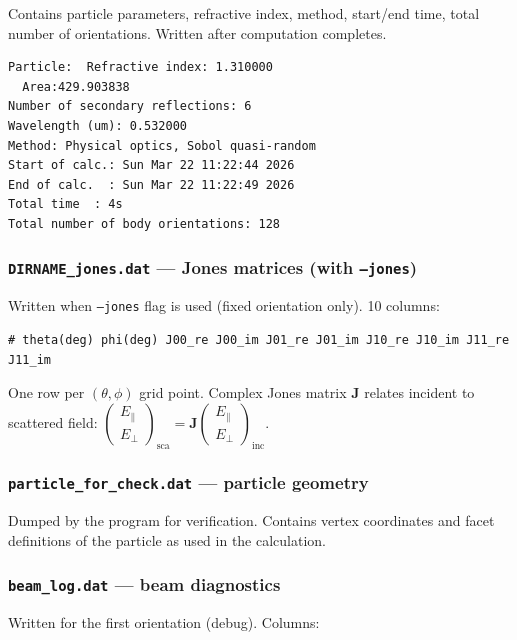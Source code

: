 \documentclass[11pt,a4paper]{article}
\begin{document}
Contains particle parameters, refractive index, method, start/end time,
total number of orientations. Written after computation completes.

\begin{lstlisting}[basicstyle=\ttfamily\scriptsize]
Particle:  Refractive index: 1.310000
  Area:429.903838
Number of secondary reflections: 6
Wavelength (um): 0.532000
Method: Physical optics, Sobol quasi-random
Start of calc.: Sun Mar 22 11:22:44 2026
End of calc.  : Sun Mar 22 11:22:49 2026
Total time  : 4s
Total number of body orientations: 128
\end{lstlisting}

\subsubsection{\texttt{DIRNAME\_jones.dat} --- Jones matrices (with \texttt{--jones})}

Written when \texttt{--jones} flag is used (fixed orientation only). 10 columns:

\begin{lstlisting}[basicstyle=\ttfamily\scriptsize]
# theta(deg) phi(deg) J00_re J00_im J01_re J01_im J10_re J10_im J11_re J11_im
\end{lstlisting}

One row per $(\theta, \phi)$ grid point. Complex Jones matrix $\mathbf{J}$ relates
incident to scattered field: $\begin{pmatrix}E_\parallel\\E_\perp\end{pmatrix}_\text{sca}
= \mathbf{J}\begin{pmatrix}E_\parallel\\E_\perp\end{pmatrix}_\text{inc}$.

\subsubsection{\texttt{particle\_for\_check.dat} --- particle geometry}

Dumped by the program for verification. Contains vertex coordinates and facet
definitions of the particle as used in the calculation.

\subsubsection{\texttt{beam\_log.dat} --- beam diagnostics}

Written for the first orientation (debug). Columns:
\end{document}
